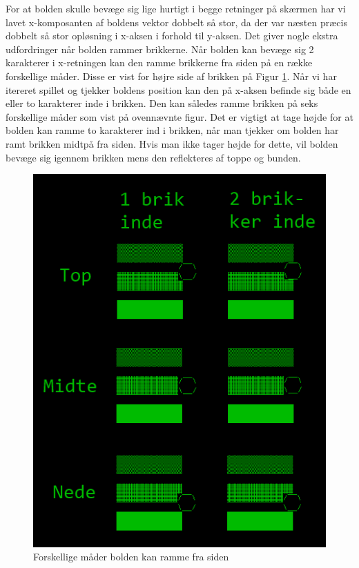 For at bolden skulle bevæge sig lige hurtigt i begge retninger på skærmen har vi lavet x-komposanten af boldens vektor dobbelt så stor, da der var næsten præcis dobbelt så stor opløsning i x-aksen i forhold til y-aksen. Det giver nogle ekstra udfordringer når bolden rammer brikkerne. Når bolden kan bevæge sig 2 karakterer i x-retningen kan den ramme brikkerne fra siden på en række forskellige måder. Disse er vist for højre side af brikken på Figur \ref{fig:SideReflexSamlet}. 
Når vi har itereret spillet og tjekker boldens position kan den på x-aksen befinde sig både en eller to karakterer inde i brikken. Den kan således ramme brikken på seks forskellige måder som vist på ovennævnte figur. Det er vigtigt at tage højde for at bolden kan ramme to karakterer ind i brikken, når man tjekker om bolden har ramt brikken midtpå fra siden. Hvis man ikke tager højde for dette, vil bolden bevæge sig igennem brikken mens den reflekteres af toppe og bunden.\\

\begin{figure}[h!]
\centering
\includegraphics[scale=0.75]{figs/side_reflex_samlet.png}
\caption{Forskellige måder bolden kan ramme fra siden}
\label{fig:SideReflexSamlet}
\end{figure}
\newpage

